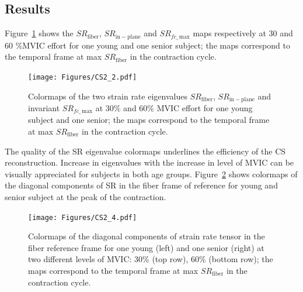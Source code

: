 \subsection{Results}
Figure~\ref{fig: CSYO2} shows the $SR_\mathrm{fiber}$, $SR_\mathrm{in-plane}$ and $SR_{fc\_\,\mathrm{max}}$ maps respectively at 30 and 60 \%MVIC effort for one young and one senior subject; the maps correspond to the temporal frame at max $SR_\mathrm{fiber}$ in the contraction cycle.
\begin{figure}
\vspace{+0.2cm}
\centering
\texttt{[image: Figures/CS2\_2.pdf]}
\captionsetup{width=8.5in}
\caption[Colormaps of the two strain rate eigenvalues $SR_\mathrm{fiber}$, $SR_\mathrm{in-plane}$ and invariant $SR_{fc\_\,\mathrm{max}}$ at 30\% and 60\% MVIC effort for one young and one senior subject]{Colormaps of the two strain rate eigenvalues $SR_\mathrm{fiber}$, $SR_\mathrm{in-plane}$ and invariant $SR_{fc\_\,\mathrm{max}}$ at 30\% and 60\% MVIC effort for one young subject and one senior; the maps correspond to the temporal frame at max $SR_\mathrm{fiber}$ in the contraction cycle.}
\label{fig: CSYO2}
\end{figure}
The quality of the SR eigenvalue colormaps underlines the efficiency of the CS reconstruction. 
Increase in eigenvalues with the increase in level of MVIC can be visually appreciated for subjects in both age groups. 
Figure~\ref{fig: CSYO4} shows colormaps of the diagonal components of SR in the fiber frame of reference for young and senior subject at the peak of the contraction.
\begin{figure}
\vspace{+0.2cm}
\centering
\texttt{[image: Figures/CS2\_4.pdf]}
\captionsetup{width=8.5in}
\caption[Colormaps of the diagonal components of strain rate tensor in the fiber reference frame for one young and one senior subjects at two different levels of MVIC]{Colormaps of the diagonal components of strain rate tensor in the fiber reference frame for one young (left) and one senior (right) at two different levels of MVIC: 30\% (top row), 60\% (bottom row); the maps correspond to the temporal frame at max $SR_\mathrm{fiber}$ in the contraction cycle.}
\label{fig: CSYO4}
\end{figure}
